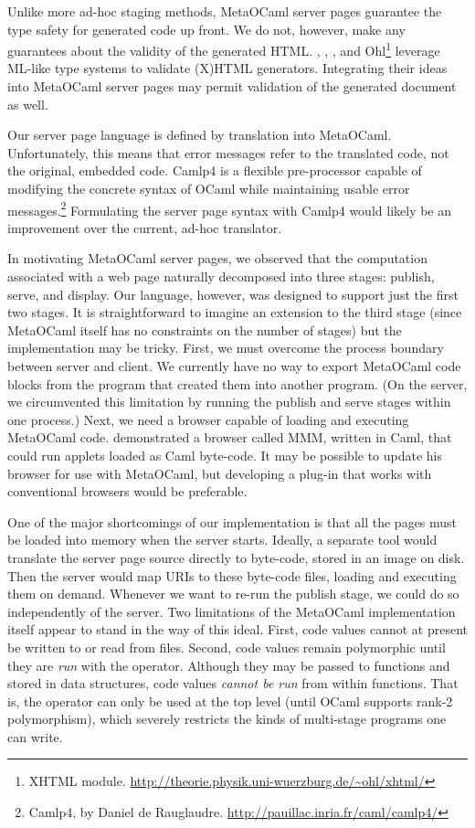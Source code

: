 \documentclass{elsart}
\def\MOC{MetaOCaml\xspace}
\begin{document}
Unlike more ad-hoc staging methods, \MOC server pages guarantee the
type safety for generated code up front.  We do not, however, make any
guarantees about the validity of the generated HTML.
\citet{elsman04typing}, \citet{wallace99haxml}, \citet{hosoya03xduce},
and Ohl\footnote{XHTML module.
  \url{http://theorie.physik.uni-wuerzburg.de/~ohl/xhtml/}} 
leverage ML-like type systems to validate (X)HTML generators.
Integrating their ideas into \MOC server pages may permit validation
of the generated document as well.

Our server page language is defined by translation into \MOC.
Unfortunately, this means that error messages refer to the translated
code, not the original, embedded code.  Camlp4 is a flexible
pre-processor capable of modifying the concrete syntax of OCaml while
maintaining usable error messages.\footnote{Camlp4, by Daniel de
  Rauglaudre.  \url{http://pauillac.inria.fr/caml/camlp4/}}
Formulating the server page syntax with Camlp4 would likely be an
improvement over the current, ad-hoc translator.

In motivating \MOC server pages, we observed that the computation
associated with a web page naturally decomposed into three stages:
publish, serve, and display.  Our language, however, was designed to
support just the first two stages.  It is straightforward to imagine
an extension to the third stage (since \MOC itself has no constraints
on the number of stages) but the implementation may be tricky.  First,
we must overcome the process boundary between server and client.  We
currently have no way to export \MOC code blocks from the program that
created them into another program.  (On the server, we circumvented
this limitation by running the publish and serve stages within one
process.)  Next, we need a browser capable of loading and executing
\MOC code.  \citet{rouaix96web} demonstrated a browser called MMM,
written in Caml, that could run applets loaded as Caml byte-code.  It
may be possible to update his browser for use with \MOC, but
developing a plug-in that works with conventional browsers would be
preferable.

One of the major shortcomings of our implementation is that all the
pages must be loaded into memory when the server starts.  Ideally, a
separate tool would translate the server page source directly to
byte-code, stored in an image on disk.  Then the server would map URIs
to these byte-code files, loading and executing them on demand.
Whenever we want to re-run the publish stage, we could do so
independently of the server.  Two limitations of the \MOC
implementation itself appear to stand in the way of this ideal.
First, code values cannot at present be written to or read from files.
Second, code values remain polymorphic until they are \emph{run} with
the \Mrun{} operator.  Although they may be passed to functions and
stored in data structures, code values \emph{cannot be run} from
within functions.  That is, the \Mrun{} operator can only be used at
the top level (until OCaml supports rank-2 polymorphism), which
severely restricts the kinds of multi-stage programs one can write.
\end{document}
